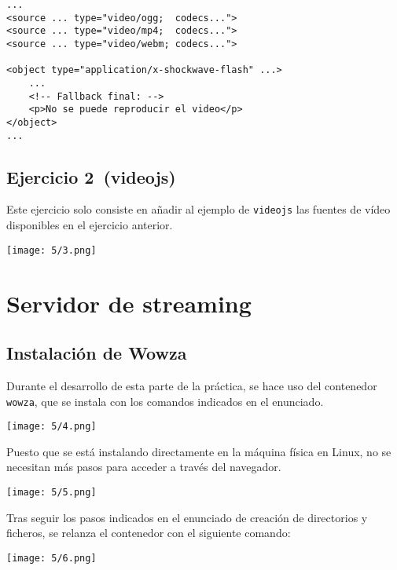 \begin{verbatim}
...
<source ... type="video/ogg;  codecs...">
<source ... type="video/mp4;  codecs...">
<source ... type="video/webm; codecs...">

<object type="application/x-shockwave-flash" ...>
	...
	<!-- Fallback final: -->
	<p>No se puede reproducir el video</p>
</object>
...
\end{verbatim}

\subsection{Ejercicio 2~(videojs)}
Este ejercicio solo consiste en añadir al ejemplo de \Verb#videojs# las fuentes de vídeo
disponibles en el ejercicio anterior.

\begin{minipage}{\linewidth}
	\centering
	\texttt{[image: 5/3.png]}
	\label{fig:5/3}
\end{minipage}

\section{Servidor de streaming}
\subsection{Instalación de Wowza}
Durante el desarrollo de esta parte de la práctica, se hace uso del contenedor \Verb#wowza#,
que se instala con los comandos indicados en el enunciado.

\begin{minipage}{\linewidth}
	\centering
	\texttt{[image: 5/4.png]}
	\label{fig:5/4}
\end{minipage}

Puesto que se está instalando directamente en la máquina física en Linux, no se necesitan
más pasos para acceder a través del navegador.

\begin{minipage}{\linewidth}
	\centering
	\texttt{[image: 5/5.png]}
	\label{fig:5/5}
\end{minipage}

Tras seguir los pasos indicados en el enunciado de creación de directorios y ficheros,
se relanza el contenedor con el siguiente comando:

\begin{minipage}{\linewidth}
	\centering
	\texttt{[image: 5/6.png]}
	\label{fig:5/6}
\end{minipage}

